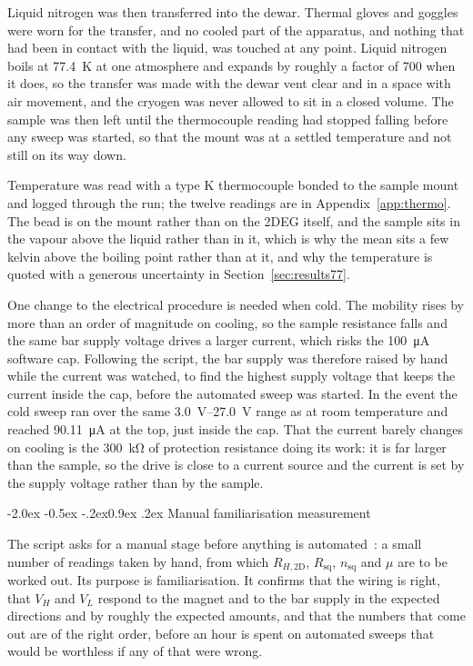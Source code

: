 \documentclass[11pt,a4paper]{article}
\makeatletter
\renewcommand\subsection{\@startsection{subsection}{2}{\z@}%
  {-2.0ex \@plus -0.5ex \@minus -.2ex}{0.9ex \@plus .2ex}%
  {\normalfont\normalsize\bfseries}}
\newcommand{\Rsq}{R_{\mathrm{sq}}}
\newcommand{\Rhtwod}{R_{H,\mathrm{2D}}}
\newcommand{\nsq}{n_{\mathrm{sq}}}
\makeatother
\begin{document}
Liquid nitrogen was then transferred into the dewar. Thermal gloves and goggles were worn for
the transfer, and no cooled part of the apparatus, and nothing that had been in contact with
the liquid, was touched at any point. Liquid nitrogen boils at \qty{77.4}{\kelvin} at one
atmosphere and expands by roughly a factor of \num{700} when it does, so the transfer was made
with the dewar vent clear and in a space with air movement, and the cryogen was never allowed
to sit in a closed volume. The sample was then left until the thermocouple reading had stopped
falling before any sweep was started, so that the mount was at a settled temperature and not
still on its way down.

Temperature was read with a type K thermocouple bonded to the sample mount and logged through
the run; the twelve readings are in Appendix~\ref{app:thermo}. The bead is on the mount rather
than on the 2DEG itself, and the sample sits in the vapour above the liquid rather than in it,
which is why the mean sits a few kelvin above the boiling point rather than at it, and why the
temperature is quoted with a generous uncertainty in Section~\ref{sec:results77}.

One change to the electrical procedure is needed when cold. The mobility rises by more than an
order of magnitude on cooling, so the sample resistance falls and the same bar supply voltage
drives a larger current, which risks the \qty{100}{\micro\ampere} software cap. Following the
script, the bar supply was therefore raised by hand while the current was watched, to find the
highest supply voltage that keeps the current inside the cap, before the automated sweep was
started. In the event the cold sweep ran over the same \qtyrange{3.0}{27.0}{\volt} range as at
room temperature and reached \qty{90.11}{\micro\ampere} at the top, just inside the cap. That
the current barely changes on cooling is the \qty{300}{\kilo\ohm} of protection resistance
doing its work: it is far larger than the sample, so the drive is close to a current source and
the current is set by the supply voltage rather than by the sample.

\subsection{Manual familiarisation measurement}
\label{sec:manual}

The script asks for a manual stage before anything is automated~\cite{script}: a small number
of readings taken by hand, from which $\Rhtwod$, $\Rsq$, $\nsq$ and $\mu$ are to be worked out.
Its purpose is familiarisation. It confirms that the wiring is right, that $V_H$ and $V_L$
respond to the magnet and to the bar supply in the expected directions and by roughly the
expected amounts, and that the numbers that come out are of the right order, before an hour is
spent on automated sweeps that would be worthless if any of that were wrong.
\end{document}
